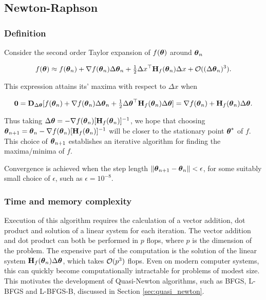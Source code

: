 \documentclass{amsart}[12pt]
\begin{document}
\subsection{Newton-Raphson}

\subsubsection{Definition}

Consider the second order Taylor expansion of $f({\boldsymbol \theta})$ around ${\boldsymbol \theta}_{n}$

$$
f({\boldsymbol \theta}) \approx f({\boldsymbol \theta}_{n}) + \nabla f({\boldsymbol \theta}_{n}) \Delta {\boldsymbol\theta}_{n} + \tfrac{1}{2} \Delta x^\top {\bf H}_f({\boldsymbol \theta}_{n}) \Delta x + {\mathcal O}((\Delta {\boldsymbol\theta}_{n})^3).
$$

This expression attains its' maxima with respect to $\Delta x$ when

$$
{\bf 0} = {\bf D}_{\Delta {\boldsymbol\theta}} [f({\boldsymbol \theta}_{n}) + \nabla f({\boldsymbol \theta}_{n}) \Delta {\boldsymbol\theta}_{n} + \tfrac{1}{2} \Delta {\boldsymbol\theta}^\top {\bf H}_f({\boldsymbol \theta}_{n}) \Delta {\boldsymbol\theta}] = \nabla f({\boldsymbol \theta}_n) + {\bf H}_f({\boldsymbol \theta}_n) \Delta {\boldsymbol\theta}.
$$

Thus taking $\Delta {\boldsymbol\theta} = -\nabla f({\boldsymbol \theta}_n) [{\bf H}_f({\boldsymbol \theta}_n)]^{-1}$, we hope that choosing
${\boldsymbol \theta}_{n + 1} = {\boldsymbol \theta}_{n} - \nabla f({\boldsymbol \theta}_n) [{\bf H}_f({\boldsymbol \theta}_n)]^{-1}$ will be closer to the stationary 
point ${\boldsymbol \theta}^*$ of $f$. This choice of ${\boldsymbol \theta}_{n+1}$ establishes an iterative algorithm for finding the 
maxima/minima of $f$.

Convergence is achieved when the step length $\| {\boldsymbol \theta}_{n+1} - {\boldsymbol \theta}_{n} \| < \epsilon$, for some
suitably small choice of $\epsilon$, such as $\epsilon = 10^{-8}$.

\subsubsection{Time and memory complexity}

Execution of this algorithm requires the calculation of a vector addition, dot product and solution of a
linear system for each iteration. The vector addition and dot product can both be performed in $p$ flops,
where $p$ is the dimension of the problem. The expensive part of the computation is the solution of the linear
system ${\bf H}_f({\boldsymbol \theta}_n) \Delta {\boldsymbol\theta}$, which takes ${\mathcal O}(p^3)$ flops. Even on modern computer systems, this
can quickly become computationally intractable for problems of modest size. This motivates the development
of Quasi-Newton algorithms, such as BFGS, L-BFGS and L-BFGS-B, discussed in Section \ref{sec:quasi_newton}.
\end{document}
